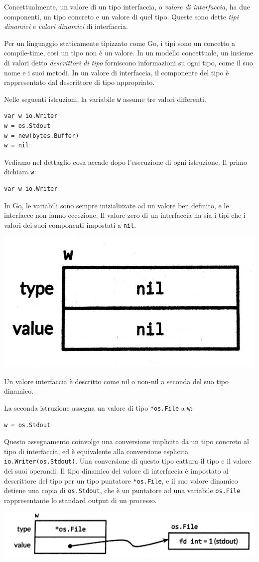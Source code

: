 %
Concettualmente, un valore di un tipo interfaccia, o \textit{valore di interfaccia}, ha due componenti, un tipo concreto e un valore di quel tipo.
Queste sono dette \textit{tipi dinamici} e \textit{valori dinamici} di interfaccia.

Per un linguaggio staticamente tipizzato come Go, i tipi sono un concetto a compile-time, così un tipo non è un valore.
In un modello concettuale, un insieme di valori detto \textit{descrittori di tipo} forniscono informazioni su ogni tipo, come il suo nome e i suoi metodi.
In un valore di interfaccia, il componente del tipo è rappresentato dal descrittore di tipo appropriato.

Nelle seguenti istruzioni, la variabile \verb|w| assume tre valori differenti.
\begin{lstlisting}[frame=single, label={lst:lstlisting6-5.1}]
var w io.Writer
w = os.Stdout
w = new(bytes.Buffer)
w = nil
\end{lstlisting}
Vediamo nel dettaglio cosa accade dopo l'esecuzione di ogni istruzione.
Il primo dichiara \verb|w|:
\begin{lstlisting}[frame=single, label={lst:lstlisting6-5.2}]
var w io.Writer
\end{lstlisting}
In Go, le variabili sono sempre inizializzate ad un valore ben definito, e le interfacce non fanno eccezione.
Il valore zero di un interfaccia ha sia i tipi che i valori dei suoi componenti impostati a \verb|nil|.
\begin{center}
    \includegraphics[width=0.4\linewidth]{figures/figura6.1}
\end{center}

Un valore interfaccia è descritto come nil o non-nil a seconda del suo tipo dinamico.

La seconda istruzione assegna un valore di tipo \verb|*os.File| a \verb|w|:
\begin{lstlisting}[frame=single, label={lst:lstlisting6-5.3}]
w = os.Stdout
\end{lstlisting}
Questo assegnamento coinvolge una conversione implicita da un tipo concreto al tipo di interfaccia, ed è equivalente alla conversione esplicita \verb|io.Writer(os.Stdout)|.
Una conversione di questo tipo cattura il tipo e il valore dei suoi operandi.
Il tipo dinamico del valore di interfaccia è impostato al descrittore del tipo per un tipo puntatore \verb|*os.File|, e il suo valore dinamico detiene una copia di \verb|os.Stdout|, che è un puntatore ad una variabile \verb|os.File| rappresentante lo standard output di un processo.
\begin{center}
    \includegraphics[width=0.5\linewidth]{figures/figura6.2}
\end{center}

